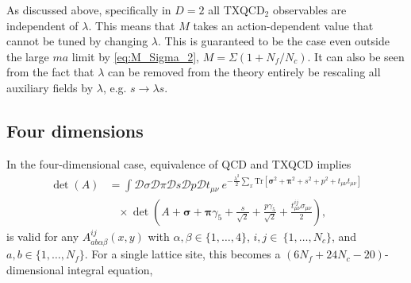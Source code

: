 \documentclass[%
    twocolumn,
superscriptaddress,
preprintnumbers,
nofootinbib,
 amsmath,amssymb,
 aps,
 prd,
 floatfix,
]{revtex4-2}
\begin{document}
As discussed above, specifically in $D=2$ all TXQCD$_2$ observables are independent of $\lambda$.
This means that $M$ takes an action-dependent value that cannot be tuned by changing $\lambda$.
This is guaranteed to be the case even outside the large $ma$ limit by \cref{eq:M_Sigma_2}, $M = \Sigma (1 + N_f/N_c)$.
It can also be seen from the fact that $\lambda$ can be removed from the theory entirely be rescaling all auxiliary fields by $\lambda$, e.g. $s \rightarrow \lambda s$.


\subsection{Four dimensions}

In the four-dimensional case, equivalence of QCD and TXQCD implies
\begin{equation}
  \begin{split}
  \det(A) &= \int \mathcal{D}\sigma \mathcal{D}\pi \mathcal{D}s \mathcal{D}p \mathcal{D}t_{\mu\nu} \ e^{-\frac{\lambda^2}{2} \sum_x \text{Tr}[\bm{\sigma}^2+ \bm{\pi}^2 + s^2 + p^2 + t_{\mu\nu}t_{\mu\nu}]} \\
  &\hspace{10pt} \times \det\left(A  + \bm{\sigma} + \bm{\pi} \gamma_5  + \frac{s}{\sqrt{2}} + \frac{p \gamma_5 }{\sqrt{2}} + \frac{t^{ij}_{\mu\nu} \sigma_{\mu\nu} }{2} \right),
  \end{split}
\end{equation}
is valid for any $A_{ab\alpha\beta}^{ij}(x,y)$ with $\alpha,\beta \in \{1,\ldots,4\}$, $i,j\in~\{1,\ldots,N_c\}$, and $a,b\in \{1,\ldots,N_f\}$.
For a single lattice site, this becomes a $(6N_f+24N_c - 20)$-dimensional integral equation,
\end{document}
